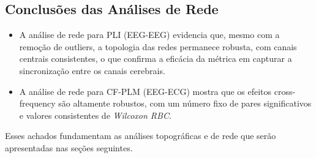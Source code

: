 \subsection{Conclusões das Análises de Rede}
\begin{itemize}
    \item A análise de rede para PLI (EEG-EEG) evidencia que, mesmo com a remoção de outliers, a topologia das redes permanece robusta, com canais centrais consistentes, o que confirma a eficácia da métrica em capturar a sincronização entre os canais cerebrais.
    \item A análise de rede para CF-PLM (EEG-ECG) mostra que os efeitos cross-frequency são altamente robustos, com um número fixo de pares significativos e valores consistentes de \emph{Wilcoxon RBC}.
\end{itemize}

Esses achados fundamentam as análises topográficas e de rede que serão apresentadas nas seções seguintes.